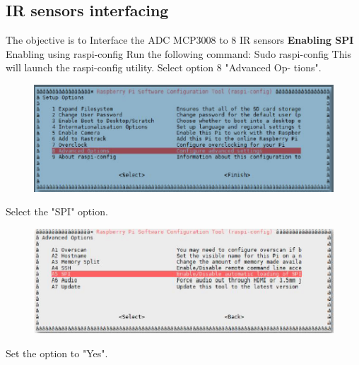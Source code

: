 \documentclass[11pt,a4paper]{report}
\begin{document}
\begin{flushleft}
	\subsection{IR sensors  interfacing}
	The objective is to Interface the ADC MCP3008 to 8 IR sensors \vspace{0.2cm}\newline
	\textbf{Enabling SPI}\vspace{0.2cm}\newline
	Enabling using raspi-config\newline
	Run the following command:\newline
Sudo raspi-config\newline
This will launch the raspi-config utility. Select option 8 "Advanced Op-
tions".\newline
\begin{figure}[h!]
		\includegraphics[scale=0.7]{spi1.png}
		\centering
		\caption{}
	    \end{figure}\newline
Select the "SPI" option.\newline
\begin{figure}[h!]
		\includegraphics[scale=0.7]{spi2.png}
		\centering
		\caption{}
	    \end{figure}\newline
	    Set the option to "Yes".\newline
	   

\end{flushleft}
\end{document}
